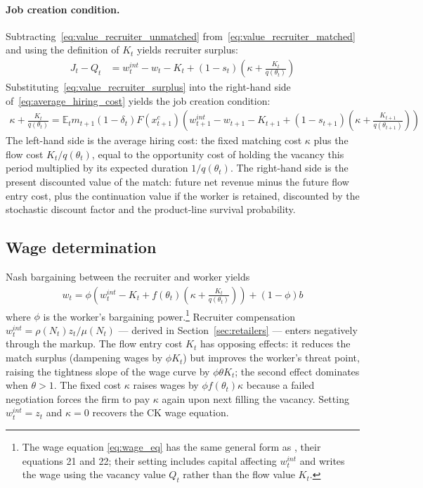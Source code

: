 \documentclass[authoryear, review, 12pt]{elsarticle}
\begin{document}
	\paragraph{Job creation condition.}
	Subtracting~\eqref{eq:value_recruiter_unmatched} 
	from~\eqref{eq:value_recruiter_matched} and using the definition 
	of $K_t$ yields recruiter surplus:
	\begin{align}\label{eq:value_recruiter_surplus}
		J_t - Q_t &= w_t^{int}-w_t - K_t 
		+ (1-s_t)\left(\kappa+\frac{K_t}{q(\theta_t)}\right)
	\end{align}
	Substituting~\eqref{eq:value_recruiter_surplus} into the 
	right-hand side of~\eqref{eq:average_hiring_cost} yields the 
	job creation condition:
	\begin{align}\label{eq:jcc}
		\kappa+\frac{K_t}{q(\theta_t)} = 
		\mathbb{E}_t m_{t+1}(1-\delta_{t})F(x_{t+1}^c)
		\left(w_{t+1}^{int}-w_{t+1}-K_{t+1}
		+(1-s_{t+1})\left(\kappa+\frac{K_{t+1}}{q(\theta_{t+1})}
		\right)\right)
	\end{align}
	The left-hand side is the average hiring cost: the fixed 
	matching cost $\kappa$ plus the flow cost $K_t/q(\theta_t)$, 
	equal to the opportunity cost of holding the vacancy this 
	period multiplied by its expected duration $1/q(\theta_t)$. 
	The right-hand side is the present discounted value of the 
	match: future net revenue minus the future flow entry cost, 
	plus the continuation value if the worker is retained, 
	discounted by the stochastic discount factor and the 
	product-line survival probability.
	
	\subsection{Wage determination}
	
	Nash bargaining between the recruiter and worker yields
	\begin{align}\label{eq:wage_eq}
		w_t = \phi\left(w_t^{int} - K_t 
		+ f(\theta_t)\left(\kappa
		+\frac{K_t}{q(\theta_t)}\right)\right)
		+(1-\phi)b
	\end{align}
	where $\phi$ is the worker's bargaining power.\footnote{The 
		wage equation \eqref{eq:wage_eq} has the same general form as 
		\citet{shao_2013}, their equations 21 and 22; their setting 
		includes capital affecting $w_t^{int}$ and writes the wage 
		using the vacancy value $Q_t$ rather than the flow value 
		$K_t$.} Recruiter compensation $w_t^{int}=\rho(N_t)z_t/
	\mu(N_t)$ — derived in Section~\ref{sec:retailers} — enters 
	negatively through the markup. The flow entry cost $K_t$ has 
	opposing effects: it reduces the match surplus (dampening 
	wages by $\phi K_t$) but improves the worker's threat point, 
	raising the tightness slope of the wage curve by $\phi\theta 
	K_t$; the second effect dominates when $\theta>1$. The fixed 
	cost $\kappa$ raises wages by $\phi f(\theta_t)\kappa$ because 
	a failed negotiation forces the firm to pay $\kappa$ again 
	upon next filling the vacancy. Setting $w_t^{int}=z_t$ and 
	$\kappa=0$ recovers the CK wage equation.
	
\end{document}
